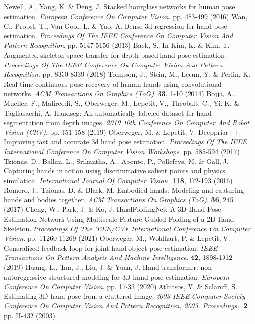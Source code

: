 \documentclass{article}
\begin{document}
\begin{thebibliography}{00}
Newell, A., Yang, K. \& Deng, J. Stacked hourglass networks for human pose estimation. {\em European Conference On Computer Vision}. pp. 483-499 (2016)
Wan, C., Probst, T., Van Gool, L. \& Yao, A. Dense 3d regression for hand pose estimation. {\em Proceedings Of The IEEE Conference On Computer Vision And Pattern Recognition}. pp. 5147-5156 (2018)
Baek, S., In Kim, K. \& Kim, T. Augmented skeleton space transfer for depth-based hand pose estimation. {\em Proceedings Of The IEEE Conference On Computer Vision And Pattern Recognition}. pp. 8330-8339 (2018)
Tompson, J., Stein, M., Lecun, Y. \& Perlin, K. Real-time continuous pose recovery of human hands using convolutional networks. {\em ACM Transactions On Graphics (ToG)}. \textbf{33}, 1-10 (2014)
Bojja, A., Mueller, F., Malireddi, S., Oberweger, M., Lepetit, V., Theobalt, C., Yi, K. \& Tagliasacchi, A. Handseg: An automatically labeled dataset for hand segmentation from depth images. {\em 2019 16th Conference On Computer And Robot Vision (CRV)}. pp. 151-158 (2019)
Oberweger, M. \& Lepetit, V. Deepprior++: Improving fast and accurate 3d hand pose estimation. {\em Proceedings Of The IEEE International Conference On Computer Vision Workshops}. pp. 585-594 (2017)
Tzionas, D., Ballan, L., Srikantha, A., Aponte, P., Pollefeys, M. \& Gall, J. Capturing hands in action using discriminative salient points and physics simulation. {\em International Journal Of Computer Vision}. \textbf{118}, 172-193 (2016)
Romero, J., Tzionas, D. \& Black, M. Embodied hands: Modeling and capturing hands and bodies together. {\em ACM Transactions On Graphics (ToG)}. \textbf{36}, 245 (2017)
Cheng, W., Park, J. \& Ko, J. HandFoldingNet: A 3D Hand Pose Estimation Network Using Multiscale-Feature Guided Folding of a 2D Hand Skeleton. {\em Proceedings Of The IEEE/CVF International Conference On Computer Vision}. pp. 11260-11269 (2021)
Oberweger, M., Wohlhart, P. \& Lepetit, V. Generalized feedback loop for joint hand-object pose estimation. {\em IEEE Transactions On Pattern Analysis And Machine Intelligence}. \textbf{42}, 1898-1912 (2019)
Huang, L., Tan, J., Liu, J. \& Yuan, J. Hand-transformer: non-autoregressive structured modeling for 3D hand pose estimation. {\em European Conference On Computer Vision}. pp. 17-33 (2020)
Athitsos, V. \& Sclaroff, S. Estimating 3D hand pose from a cluttered image. {\em 2003 IEEE Computer Society Conference On Computer Vision And Pattern Recognition, 2003. Proceedings.}. \textbf{2} pp. II-432 (2003)

\end{thebibliography}
\end{document}
